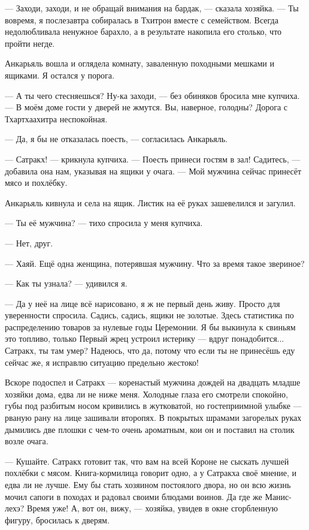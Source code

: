 --- Заходи, заходи, и не обращай внимания на бардак, --- сказала хозяйка.
--- Ты вовремя, я послезавтра собиралась в Тхитрон вместе с семейством.
Всегда недолюбливала ненужное барахло, а в результате накопила его столько, что пройти негде.

Анкарьяль вошла и оглядела комнату, заваленную походными мешками и ящиками.
Я остался у порога.

--- А ты чего стесняешься?
Ну-ка заходи, --- без обиняков бросила мне купчиха.
--- В моём доме гости у дверей не жмутся.
Вы, наверное, голодны?
Дорога с Тхартхаахитра неспокойная.

--- Да, я бы не отказалась поесть, --- согласилась Анкарьяль.

--- Сатракх! --- крикнула купчиха.
--- Поесть принеси гостям в зал!
Садитесь, --- добавила она нам, указывая на ящики у очага.
--- Мой мужчина сейчас принесёт мясо и похлёбку.

Анкарьяль кивнула и села на ящик.
Листик на её руках зашевелился и загулил.

--- Ты её мужчина? --- тихо спросила у меня купчиха.

--- Нет, друг.

--- Хаяй.
Ещё одна женщина, потерявшая мужчину.
Что за время такое звериное?

--- Как ты узнала? --- удивился я.

--- Да у неё на лице всё нарисовано, я ж не первый день живу.
Просто для уверенности спросила.
Садись, садись, ящики не золотые.
Здесь статистика по распределению товаров за нулевые годы Церемонии.
Я бы выкинула к свиньям это топливо, только Первый жрец устроил истерику --- вдруг понадобится...
Сатракх, ты там умер?
Надеюсь, что да, потому что если ты не принесёшь еду сейчас же, я исправлю ситуацию предельно жестоко!

Вскоре подоспел и Сатракх --- коренастый мужчина дождей на двадцать младше хозяйки дома, едва ли не ниже меня.
Холодные глаза его смотрели спокойно, губы под разбитым носом кривились в жутковатой, но гостеприимной улыбке --- рваную рану на лице зашивали второпях.
В покрытых шрамами загорелых руках дымились две плошки с чем-то очень ароматным, кои он и поставил на столик возле очага.

--- Кушайте.
Сатракх готовит так, что вам на всей Короне не сыскать лучшей похлёбки с мясом.
Книга-кормилица говорит одно, а у Сатракха своё мнение, и едва ли не лучше.
Ему бы стать хозяином постоялого двора, но он всю жизнь мочил сапоги в походах и радовал своими блюдами воинов.
Да где же Манис-лехэ?
Время уже!
А, вот он, вижу, --- хозяйка, увидев в окне сгорбленную фигуру, бросилась к дверям.

